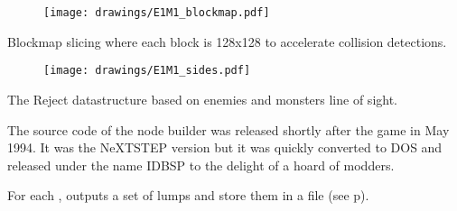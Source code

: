 \begin{figure}[H]
\centering
\texttt{[image: drawings/E1M1\_blockmap.pdf]}
\end{figure}
\par
Blockmap slicing where each block is 128x128 to accelerate collision detections.\\
\par
\begin{figure}[H]
\centering
\texttt{[image: drawings/E1M1\_sides.pdf]}
\end{figure}
\par
The Reject datastructure based on enemies and monsters line of sight.
\pagebreak


The source code of the node builder was released shortly after the game in May 1994. It was the NeXTSTEP version but it was quickly converted to DOS and released under the name IDBSP to the delight of a hoard of modders.\\
\par
{}
\par
For each ,  outputs a set of lumps and store them in a  file (see p\pageref{wad_explained}).\\

